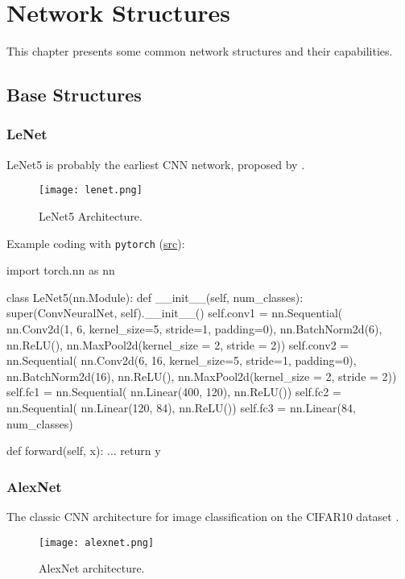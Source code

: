\chapter{Network Structures}
This chapter presents some common network structures and their capabilities.

\section{Base Structures}
\subsection{LeNet}
LeNet5 is probably the earliest \ac{CNN} network, proposed by .

\begin{figure}[hbt!]
	\centering
	\texttt{[image: lenet.png]}
	\caption{LeNet5 Architecture. \cite{lecun1998gradient}}
\end{figure}

Example coding with \texttt{pytorch} (\href{https://blog.paperspace.com/writing-lenet5-from-scratch-in-python/}{src}):
\begin{python}
import torch.nn as nn
	
class LeNet5(nn.Module):
	def __init__(self, num_classes):
		super(ConvNeuralNet, self).__init__()
		self.conv1 = nn.Sequential(
		nn.Conv2d(1, 6, kernel_size=5, stride=1, padding=0),
		nn.BatchNorm2d(6),
		nn.ReLU(),
		nn.MaxPool2d(kernel_size = 2, stride = 2))
		self.conv2 = nn.Sequential(
		nn.Conv2d(6, 16, kernel_size=5, stride=1, padding=0),
		nn.BatchNorm2d(16),
		nn.ReLU(),
		nn.MaxPool2d(kernel_size = 2, stride = 2))
		self.fc1 = nn.Sequential(
		nn.Linear(400, 120),
		nn.ReLU())
		self.fc2 = nn.Sequential(
		nn.Linear(120, 84),
		nn.ReLU())
		self.fc3 = nn.Linear(84, num_classes)
	
	def forward(self, x):
		...
		return y
\end{python}

\subsection{AlexNet}
The classic \ac{CNN} architecture for image classification on the CIFAR10 dataset \cite{krizhevsky2012imagenet}.

\begin{figure}[hbt!]
	\centering
	\texttt{[image: alexnet.png]}
	\caption{AlexNet architecture. \cite{krizhevsky2012imagenet}}
\end{figure}

